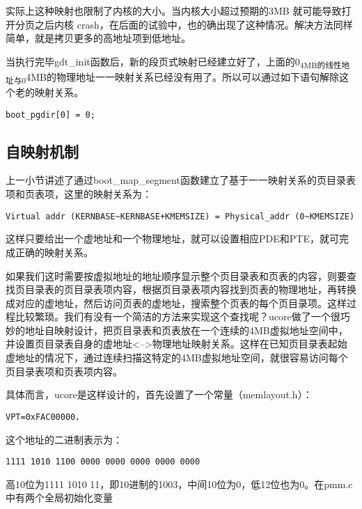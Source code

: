 实际上这种映射也限制了内核的大小。当内核大小超过预期的3MB
就可能导致打开分页之后内核
crash，在后面的试验中，也的确出现了这种情况。解决方法同样简单，就是拷贝更多的高地址项到低地址。

当执行完毕gdt\_init函数后，新的段页式映射已经建立好了，上面的0\textsubscript{4MB的线性地址与0}4MB的物理地址一一映射关系已经没有用了。所以可以通过如下语句解除这个老的映射关系。

\begin{lstlisting}
boot_pgdir[0] = 0;
\end{lstlisting}

\subsection{自映射机制}\label{ux81eaux6620ux5c04ux673aux5236}

上一小节讲述了通过boot\_map\_segment函数建立了基于一一映射关系的页目录表项和页表项，这里的映射关系为：

\begin{lstlisting}
Virtual addr (KERNBASE~KERNBASE+KMEMSIZE) = Physical_addr (0~KMEMSIZE)
\end{lstlisting}

这样只要给出一个虚地址和一个物理地址，就可以设置相应PDE和PTE，就可完成正确的映射关系。

如果我们这时需要按虚拟地址的地址顺序显示整个页目录表和页表的内容，则要查找页目录表的页目录表项内容，根据页目录表项内容找到页表的物理地址，再转换成对应的虚地址，然后访问页表的虚地址，搜索整个页表的每个页目录项。这样过程比较繁琐。我们有没有一个简洁的方法来实现这个查找呢？ucore做了一个很巧妙的地址自映射设计，把页目录表和页表放在一个连续的4MB虚拟地址空间中，并设置页目录表自身的虚地址\textless{}--\textgreater{}物理地址映射关系。这样在已知页目录表起始虚地址的情况下，通过连续扫描这特定的4MB虚拟地址空间，就很容易访问每个页目录表项和页表项内容。

具体而言，ucore是这样设计的，首先设置了一个常量（memlayout.h）：

\begin{lstlisting}
VPT=0xFAC00000， 
\end{lstlisting}

这个地址的二进制表示为：

\begin{lstlisting}
1111 1010 1100 0000 0000 0000 0000 0000
\end{lstlisting}

高10位为1111 1010
11，即10进制的1003，中间10位为0，低12位也为0。在pmm.c中有两个全局初始化变量

